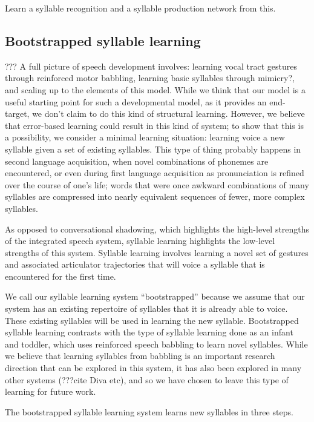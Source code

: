 Learn a syllable recognition
and a syllable production
network from this.

\subsection{Bootstrapped syllable learning}

??? A full picture of speech development involves:
learning vocal tract gestures
through reinforced motor babbling,
learning basic syllables
through mimicry?,
and scaling up to the elements of this model.
While we think that our model
is a useful starting point for such
a developmental model,
as it provides an end-target,
we don't claim to do this kind of structural learning.
However, we believe that error-based learning
could result in this kind of system;
to show that this is a possibility,
we consider a minimal learning situation:
learning voice a new syllable
given a set of existing syllables.
This type of thing probably happens
in second language acquisition,
when novel combinations of phonemes
are encountered,
or even during first language acquisition
as pronunciation is refined over
the course of one's life;
words that were once awkward combinations
of many syllables are compressed into
nearly equivalent sequences of fewer,
more complex syllables.

As opposed to conversational shadowing,
which highlights the high-level strengths
of the integrated speech system,
syllable learning highlights
the low-level strengths of this system.
Syllable learning involves
learning a novel set of gestures
and associated articulator trajectories
that will voice a syllable
that is encountered for the first time.

We call our syllable learning system ``bootstrapped''
because we assume that our system
has an existing repertoire of syllables
that it is already able to voice.
These existing syllables will be
used in learning the new syllable.
Bootstrapped syllable learning contrasts with
the type of syllable learning
done as an infant and toddler,
which uses reinforced speech babbling
to learn novel syllables.
While we believe that learning syllables
from babbling is an important research direction
that can be explored in this system,
it has also been explored in many other systems
(???cite Diva etc),
and so we have chosen to leave this type of learning
for future work.

The bootstrapped syllable learning system
learns new syllables in three steps.

